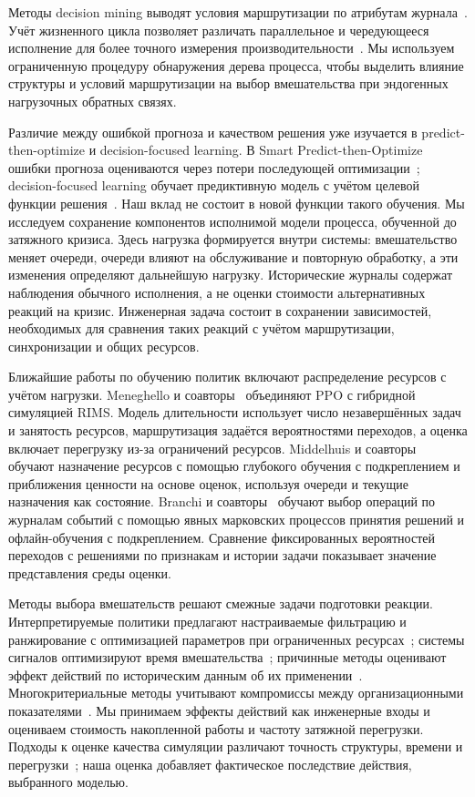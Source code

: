 Методы decision mining выводят условия маршрутизации по атрибутам журнала~\cite{decisionmining}. Учёт жизненного цикла позволяет различать параллельное и чередующееся исполнение для более точного измерения производительности~\cite{lifecycle}. Мы используем ограниченную процедуру обнаружения дерева процесса, чтобы выделить влияние структуры и условий маршрутизации на выбор вмешательства при эндогенных нагрузочных обратных связях.

Различие между ошибкой прогноза и качеством решения уже изучается в predict-then-optimize и decision-focused learning. В Smart Predict-then-Optimize ошибки прогноза оцениваются через потери последующей оптимизации~\cite{spo}; decision-focused learning обучает предиктивную модель с учётом целевой функции решения~\cite{dflsurvey}. Наш вклад не состоит в новой функции такого обучения. Мы исследуем сохранение компонентов исполнимой модели процесса, обученной до затяжного кризиса. Здесь нагрузка формируется внутри системы: вмешательство меняет очереди, очереди влияют на обслуживание и повторную обработку, а эти изменения определяют дальнейшую нагрузку. Исторические журналы содержат наблюдения обычного исполнения, а не оценки стоимости альтернативных реакций на кризис. Инженерная задача состоит в сохранении зависимостей, необходимых для сравнения таких реакций с учётом маршрутизации, синхронизации и общих ресурсов.

Ближайшие работы по обучению политик включают распределение ресурсов с учётом нагрузки. Meneghello и соавторы~\cite{hybridpolicy} объединяют PPO с гибридной симуляцией RIMS. Модель длительности использует число незавершённых задач и занятость ресурсов, маршрутизация задаётся вероятностями переходов, а оценка включает перегрузку из-за ограничений ресурсов. Middelhuis и соавторы~\cite{resourcepolicy} обучают назначение ресурсов с помощью глубокого обучения с подкреплением и приближения ценности на основе оценок, используя очереди и текущие назначения как состояние. Branchi и соавторы~\cite{rlpolicies} обучают выбор операций по журналам событий с помощью явных марковских процессов принятия решений и офлайн-обучения с подкреплением. Сравнение фиксированных вероятностей переходов с решениями по признакам и истории задачи показывает значение представления среды оценки.

Методы выбора вмешательств решают смежные задачи подготовки реакции. Интерпретируемые политики предлагают настраиваемые фильтрацию и ранжирование с оптимизацией параметров при ограниченных ресурсах~\cite{whitebox}; системы сигналов оптимизируют время вмешательства~\cite{alarms}; причинные методы оценивают эффект действий по историческим данным об их применении~\cite{causal}. Многокритериальные методы учитывают компромиссы между организационными показателями~\cite{multikpi}. Мы принимаем эффекты действий как инженерные входы и оцениваем стоимость накопленной работы и частоту затяжной перегрузки. Подходы к оценке качества симуляции различают точность структуры, времени и перегрузки~\cite{validation}; наша оценка добавляет фактическое последствие действия, выбранного моделью.
